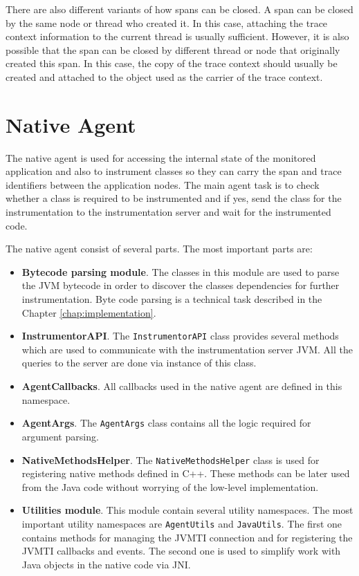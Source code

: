 There are also different variants of how spans can be closed. A span can be closed by the same node or thread who created it. In this case, attaching the trace context information to the current thread is usually sufficient. However, it is also possible that the span can be closed by different thread or node that originally created this span. In this case, the copy of the trace context should usually be created and attached to the object used as the carrier of the trace context.
\section{Native Agent}
\label{native_agent_design}
The native agent is used for accessing the internal state of the monitored application and also to instrument classes so they can carry the span and trace identifiers between the application nodes. The main agent task is to check whether a class is required to be instrumented and if yes, send the class for the instrumentation to the instrumentation server and wait for the instrumented code.

The native agent consist of several parts. The most important parts are:
\begin{itemize}
	\item \textbf{Bytecode parsing module}. \newline The classes in this module are used to parse the JVM bytecode in order to discover the classes dependencies for further instrumentation. Byte code parsing is a technical task described in the Chapter \ref{chap:implementation}.
	\item \textbf{InstrumentorAPI}. \newline The \texttt{InstrumentorAPI} class provides several methods which are used to communicate with the instrumentation server JVM. All the queries to the server are done via instance of this class.
	\item \textbf{AgentCallbacks}. \newline All callbacks used in the native agent are defined in this namespace.
	\item \textbf{AgentArgs}.  \newline The \texttt{AgentArgs} class contains all the logic required for argument parsing.
	\item \textbf{NativeMethodsHelper}. \newline The \texttt{NativeMethodsHelper} class is used for registering native methods defined in C++. These methods can be later used from the Java code without worrying of the low-level implementation.
	\item \textbf{Utilities module}. \newline This module contain several utility namespaces. The most important utility namespaces are \texttt{AgentUtils} and \texttt{JavaUtils}. The first one contains methods for managing the JVMTI connection and for registering the JVMTI callbacks and events. The second one is used to simplify work with Java objects in the native code via JNI. 
\end{itemize}

